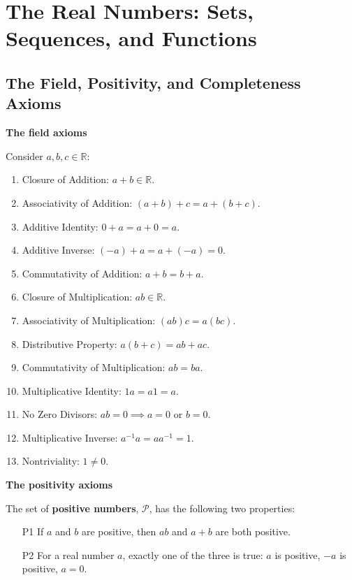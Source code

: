 \chapter{The Real Numbers: Sets, Sequences, and Functions}

\section{The Field, Positivity, and Completeness Axioms}

\begin{flushleft}

\textbf{The field axioms}\par
Consider $a,b,c \in \mathbb{R}$:
\begin{enumerate}
	\item Closure of Addition: $a+b \in \mathbb{R}$.
	\item Associativity of Addition: $(a+b)+c = a+(b+c)$.
	\item Additive Identity: $0+a=a+0=a$.
	\item Additive Inverse: $(-a)+a=a+(-a)=0$.
	\item Commutativity of Addition: $a+b=b+a$.
	\item Closure of Multiplication: $ab \in \mathbb{R}$.
	\item Associativity of Multiplication: $(ab)c = a(bc)$.
	\item Distributive Property: $ a(b+c)=ab+ac$.
	\item Commutativity of Multiplication: $ab=ba$.
	\item Multiplicative Identity: $1a=a1=a$.
	\item No Zero Divisors: $ab=0 \implies a=0 \text{ or } b=0$.
	\item Multiplicative Inverse: $a^{-1}a=aa^{-1}=1$.
	\item Nontriviality: $1 \neq 0$.
\end{enumerate}
\medskip

\textbf{The positivity axioms}\par
The set of \textbf{positive numbers}, $\mathcal{P}$, has the following two properties:
\begin{itemize}
    \item [P1] If $a$ and $b$ are positive, then $ab$ and $a+b$ are both positive.
    \item [P2] For a real number $a$, exactly one of the three is true: $a$ is positive, $-a$ is positive, $a=0$.	
\end{itemize}


\end{flushleft}
